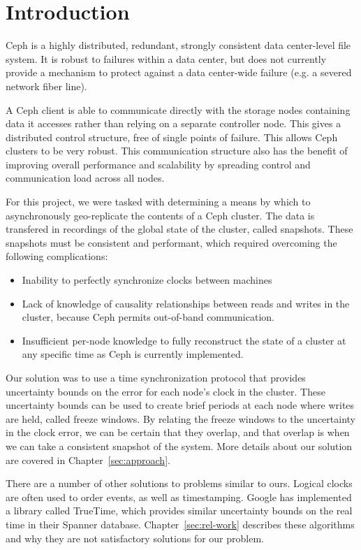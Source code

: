 \chapter{Introduction}
\label{sec:introduction}

Ceph is a highly distributed, redundant, strongly consistent data
center-level file system. It is robust to failures within a data
center, but does not currently provide a mechanism to protect against
a data center-wide failure (e.g. a severed network fiber line).

A Ceph client is able to communicate directly with the storage nodes
containing data it accesses rather than relying on a separate
controller node. This gives a distributed control structure, free of
single points of failure. This allows Ceph clusters to be very
robust. This communication structure also has the benefit of improving
overall performance and scalability by spreading control and
communication load across all nodes.

For this project, we were tasked with determining a means by which to
asynchronously geo-replicate the contents of a Ceph cluster. The data is 
transfered in recordings of the global state of the cluster, called snapshots.
These snapshots must be consistent and performant, which required overcoming 
the following complications:

\begin{itemize}
\item Inability to perfectly synchronize clocks between machines
\item Lack of knowledge of causality relationships between reads and
  writes in the cluster, because Ceph permits out-of-band
  communication.
\item Insufficient per-node knowledge to fully reconstruct the state
  of a cluster at any specific time as Ceph is currently implemented.
\end{itemize}

Our solution was to use a time synchronization protocol that provides
uncertainty bounds on the error for each node's clock in the cluster. These
uncertainty bounds can be used to create brief periods at each node where writes are 
held, called freeze windows. By relating the freeze windows to the uncertainty 
in the clock error, we can be certain that they overlap, and that overlap
is when we can take a consistent snapshot of the system. More details
about our solution are covered in Chapter~\ref{sec:approach}.

There are a number of other solutions to problems similar to
ours. Logical clocks are often used to order events, as well as
timestamping. Google has implemented a library called TrueTime, which
provides similar uncertainty bounds on the real time in their Spanner
database. Chapter~\ref{sec:rel-work} describes these algorithms and
why they are not satisfactory solutions for our problem.

